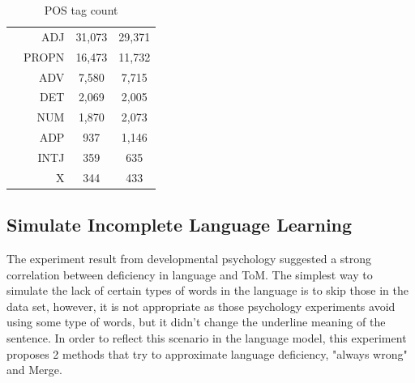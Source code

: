 \documentclass[12pt]{article}
\begin{document}
\begin{table}[!h]
\begin{center}
\begin{tabular}{|c|r|c|c|}
                               & ADJ     & 31,073          & 29,371          \\ \cline{2-4} 
                               & PROPN   & 16,473          & 11,732          \\ \cline{2-4} 
                               & ADV     & 7,580           & 7,715           \\ \cline{2-4} 
                               & DET     & 2,069           & 2,005           \\ \cline{2-4} 
                               & NUM     & 1,870           & 2,073           \\ \cline{2-4} 
                               & ADP     & 937             & 1,146           \\ \cline{2-4} 
                               & INTJ    & 359             & 635             \\ \cline{2-4} 
                               & X       & 344             & 433             \\ \hline
\end{tabular}
     \caption{POS tag count}
    \label{tab:poscount}
\end{center}
\end{table}

\subsection{Simulate Incomplete Language Learning} \label{incomplearning}
The experiment result from developmental psychology suggested a strong correlation between deficiency in language and ToM. The simplest way to simulate the lack of certain types of words in the language is to skip those in the data set, however, it is not appropriate as those psychology experiments avoid using some type of words, but it didn't change the underline meaning of the sentence.    
In order to reflect this scenario in the language model, this experiment proposes 2 methods that try to approximate language deficiency, "always wrong" and Merge. 
\end{document}
